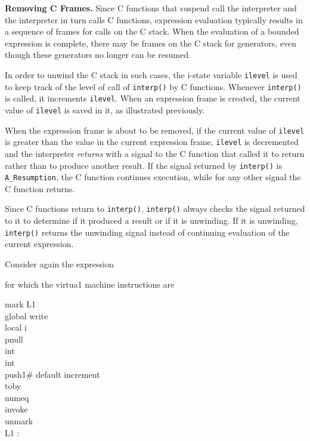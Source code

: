 \textbf{Removing C Frames.} Since C functions that suspend call the
interpreter and the interpreter in turn calls C functions, expression
evaluation typically results in a sequence of frames for calls on the
C stack. When the evaluation of a bounded expression is complete,
there may be frames on the C stack for generators, even though these
generators no longer can be resumed.

In order to {\textquotedbl}unwind{\textquotedbl} the C stack in such
cases, the i-state variable \texttt{ilevel} is used to keep track of
the level of call of \texttt{interp()} by C functions. Whenever
\texttt{interp()} is called, it increments \texttt{ilevel}. When an
expression frame is created, the current value of \texttt{ilevel} is
saved in it, as illustrated previously.

When the expression frame is about to be removed, if the current value
of \texttt{ilevel} is greater than the value in the current expression
frame, \texttt{ilevel} is decremented and the interpreter
\textit{returns }with a signal to the C function that called it to
return rather than to produce another result. If the signal returned
by \texttt{interp()} is \texttt{A\_Resumption}, the C function
continues execution, while for any other signal the C function
returns.

Since C functions return to \texttt{interp()}, \texttt{interp()}
always checks the signal returned to it to determine if it produced a
result or if it is unwinding. If it is unwinding, \texttt{interp()}
returns the unwinding signal instead of continuing evaluation
of\textit{ }the current expression.

Consider again the expression


\noindent for which the virtua1 machine instructions are

\begin{iconcode}
\>mark\>\>\> L1\\
\>global\>\>\> write\\
\>local\>\>\> i\\
\>pnull\\
\>int\>\>\\
\>int\>\>\\
\>push1\>\>\>\>\>\>\# default increment\\
\>toby\\
\>numeq\\
\>invoke\>\>\\
\>unmark\\
L1 :
\end{iconcode}


